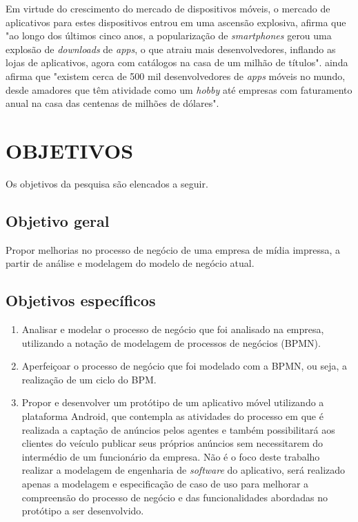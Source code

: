 \documentclass[
	12pt,				%
	openright,			%
	oneside,			%
	a4paper,			%
	chapter=TITLE,		%
	section=TITLE,		%
	english,			%
	french,				%
	spanish,			%
	brazil				%
	]{abntex2}
\begin{document}
Em virtude do crescimento do mercado de dispositivos móveis, o mercado de aplicativos para estes dispositivos entrou em uma ascensão explosiva,  afirma que "ao longo dos últimos cinco anos, a popularização de \textit{smartphones} gerou uma explosão de \textit{downloads} de \textit{apps}, o que atraiu mais desenvolvedores, inflando as lojas de aplicativos, agora com catálogos na casa de um milhão de títulos".  ainda afirma que "existem cerca de 500 mil desenvolvedores de \textit{apps} móveis no mundo, desde amadores que têm atividade como um \textit{hobby} até empresas com faturamento anual na casa das centenas de milhões de dólares".


\section{OBJETIVOS}

Os objetivos da pesquisa são elencados a seguir.

\subsection{Objetivo geral}

Propor melhorias no processo de negócio de uma empresa de mídia impressa, a partir de análise e modelagem do modelo de negócio atual.

\subsection{Objetivos específicos}

\begin{enumerate}[label=\itshape\alph*\upshape)]
	\item Analisar e modelar o processo de negócio que foi analisado na empresa, utilizando a notação de modelagem de processos de negócios (BPMN).
	\item	Aperfeiçoar o processo de negócio que foi modelado com a BPMN, ou seja, a realização de um ciclo do BPM.
	\item	Propor e desenvolver um protótipo de um aplicativo móvel utilizando a plataforma Android, que contempla as atividades do processo em que é realizada a captação de anúncios pelos agentes e também possibilitará aos clientes do veículo publicar seus próprios anúncios sem necessitarem do intermédio de um funcionário da empresa. Não é o foco deste trabalho realizar a modelagem de engenharia de \textit{software} do aplicativo, será realizado apenas a modelagem e especificação de caso de uso para melhorar a compreensão do processo de negócio e das funcionalidades abordadas no protótipo a ser desenvolvido.
	
\end{enumerate}
\end{document}
